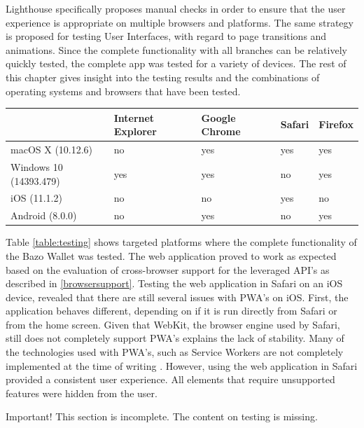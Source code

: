Lighthouse specifically proposes manual checks in order to ensure that the user experience is appropriate on multiple browsers and platforms. The same strategy is proposed for testing User Interfaces, with regard to page transitions and animations. 
Since the complete functionality with all branches can be relatively quickly tested, the complete app was tested for a variety of devices. The rest of this chapter gives insight into the testing results and the combinations of operating systems and browsers that have been tested.


\begin{center}
    \begin{tabular}{ | l | l | l | l | p{3cm} |}
    \hline
      & Internet Explorer & Google Chrome & Safari & Firefox \\ \hline
    macOS X (10.12.6)  & no & yes & yes & yes \\ \hline
    Windows 10 (14393.479)  & yes & yes & no & yes \\ \hline    
    iOS (11.1.2)  & no & no & yes & no \\ \hline
    Android (8.0.0)  & no & yes & no & yes \\ \hline
    \end{tabular}
    \label{table:testing}
    \end{center}
Table \ref{table:testing} shows targeted platforms where the complete functionality of the Bazo Wallet was tested. The web application proved to work as expected based on the evaluation of cross-browser support for the leveraged API's as described in \ref{browsersupport}. Testing the web application in Safari on an iOS device, revealed that there are still several issues with PWA's on iOS. First, the application behaves different, depending on if it is run directly from Safari or from the home screen. Given that WebKit, the browser engine used by Safari, still does not completely support PWA's explains the lack of stability. Many of the technologies used with PWA's, such as Service Workers are not completely implemented at the time of writing \cite{webkitsw}. However, using the web application in Safari provided a consistent user experience. All elements that require unsupported features were hidden from the user.
 

\begin{bclogo}[logo=\bcattention, couleurBarre=red, noborder=true, 
               couleur=LightSalmon]{Important!}
This section is incomplete. The content on testing is missing.
\end{bclogo}
\newpage
